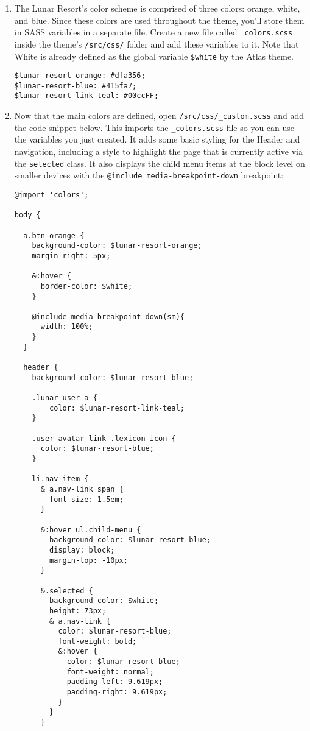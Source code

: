 \begin{enumerate}
\def\labelenumi{\arabic{enumi}.}
\setcounter{enumi}{12}
\item
  The Lunar Resort's color scheme is comprised of three colors: orange,
  white, and blue. Since these colors are used throughout the theme,
  you'll store them in SASS variables in a separate file. Create a new
  file called \texttt{\_colors.scss} inside the theme's
  \texttt{/src/css/} folder and add these variables to it. Note that
  White is already defined as the global variable \texttt{\$white} by
  the Atlas theme.

\begin{verbatim}
$lunar-resort-orange: #dfa356;
$lunar-resort-blue: #415fa7;
$lunar-resort-link-teal: #00ccFF;
\end{verbatim}
\item
  Now that the main colors are defined, open
  \texttt{/src/css/\_custom.scss} and add the code snippet below. This
  imports the \texttt{\_colors.scss} file so you can use the variables
  you just created. It adds some basic styling for the Header and
  navigation, including a style to highlight the page that is currently
  active via the \texttt{selected} class. It also displays the child
  menu items at the block level on smaller devices with the
  \texttt{@include\ media-breakpoint-down} breakpoint:

\begin{verbatim}
@import 'colors';

body {

  a.btn-orange {
    background-color: $lunar-resort-orange;
    margin-right: 5px;

    &:hover {
      border-color: $white;
    }

    @include media-breakpoint-down(sm){
      width: 100%;
    }
  }

  header {
    background-color: $lunar-resort-blue;

    .lunar-user a {
        color: $lunar-resort-link-teal;
    }

    .user-avatar-link .lexicon-icon {
      color: $lunar-resort-blue;
    }

    li.nav-item {
      & a.nav-link span {
        font-size: 1.5em;
      }

      &:hover ul.child-menu {
        background-color: $lunar-resort-blue;
        display: block;
        margin-top: -10px;
      }

      &.selected {
        background-color: $white;
        height: 73px;
        & a.nav-link {
          color: $lunar-resort-blue;
          font-weight: bold;
          &:hover {
            color: $lunar-resort-blue;
            font-weight: normal;
            padding-left: 9.619px;
            padding-right: 9.619px;
          }
        }
      }


\end{verbatim}
\end{enumerate}
